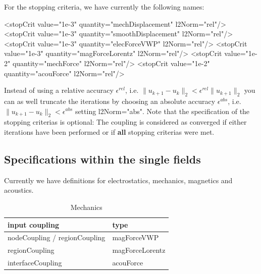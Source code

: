 \noindent
For the stopping criteria, we have currently the following names:

\begin{xmllisting}
    <stopCrit value="1e-3" quantity="mechDisplacement" l2Norm="rel"/>
    <stopCrit value="1e-3" quantity="smoothDisplacement" l2Norm="rel"/>
    <stopCrit value="1e-3" quantity="elecForceVWP" l2Norm="rel"/>
    <stopCrit value="1e-3" quantity="magForceLorentz" l2Norm="rel"/>
    <stopCrit value="1e-2" quantity="mechForce" l2Norm="rel"/>
    <stopCrit value="1e-2" quantity="acouForce" l2Norm="rel"/>

\end{xmllisting}
Instead of using a relative accuracy $\epsilon^{rel}$, i.e. $\|u_{k+1}-u_k\|_2 <
\epsilon^{rel} \|u_{k+1}\|_2$ you can as well
truncate the iterations by choosing an absolute accuracy $\epsilon^{abs}$, i.e.
$\|u_{k+1}-u_k\|_2 < \epsilon^{abs}$ setting {\sf
l2Norm="abs"}. Note that the specification of the stopping criterias
is optional: The coupling is considered as converged if either
{ } iterations have been performed or if {\bf all} stopping
criterias were met.

\newpage
\subsection{Specifications within the single fields}
Currently we have definitions for electrostatics, mechanics, magnetics and
acoustics.


\begin{table}[htb]
\begin{center}
\caption{Mechanics}
\bigskip
\begin{tabular}{ll}
\toprule
input coupling    & type \\
\midrule
nodeCoupling / regionCoupling    & magForceVWP \\
regionCoupling    & magForceLorentz \\
interfaceCoupling & acouForce \\
\bottomrule
\end{tabular}
\end{center}
\end{table}

